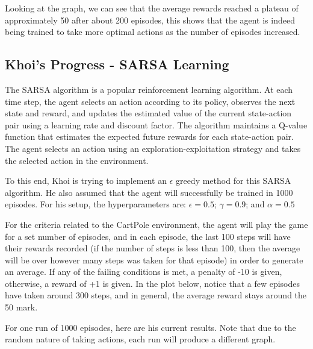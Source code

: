 \documentclass[nohyperref]{article}
\theoremstyle{plain}
\theoremstyle{definition}
\theoremstyle{remark}
\begin{document}
Looking at the graph, we can see that the average rewards reached a plateau of approximately 50 after about 200 episodes, this shows that the agent is indeed being trained to
take more optimal actions as the number of episodes increased.

\subsection{Khoi's Progress - SARSA Learning}
The SARSA algorithm is a popular reinforcement learning algorithm. At each time step, the agent selects an action according to its policy, observes the next state and reward, and updates the estimated value of the current state-action pair using a learning rate and discount factor. 
The algorithm maintains a Q-value function that estimates the expected future rewards for each state-action pair. The agent selects an action using an exploration-exploitation strategy and takes the selected action in the environment.

To this end, Khoi is trying to implement an $\epsilon$ greedy method for this SARSA algorithm. He also assumed that the agent will successfully be trained in 1000 episodes. For his setup, the hyperparameters are: $\epsilon = 0.5$; $\gamma = 0.9$; and $\alpha = 0.5$

For the criteria related to the CartPole environment, the agent will play the game for a set number of episodes, and in each episode, the last 100 steps will have their rewards recorded (if the number of steps is less than 100, then the average will be over however many steps was taken for that episode) in order to generate an average.
If any of the failing conditions is met, a penalty of -10 is given, otherwise, a reward of +1 is given. In the plot below, notice that a few episodes have taken around 300 steps, and in general, the average reward stays around the 50 mark.

For one run of 1000 episodes, here are his current results. Note that due to the random nature of taking actions, each run will produce a different graph.
\end{document}
